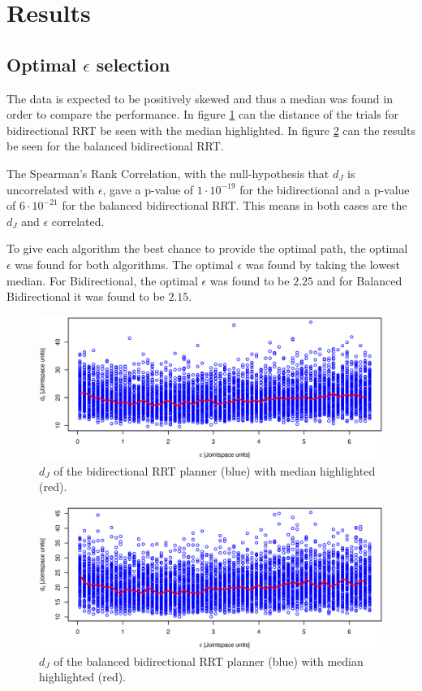 \section{Results} 
\subsection{Optimal \(\epsilon\) selection}
The data is expected to be positively skewed and thus a median was found in order to compare the performance.
In figure \ref{fig:bidir_correlated} can the distance of the trials for bidirectional RRT be seen with the median highlighted.
In figure \ref{fig:balanced_correlated} can the results be seen for the balanced bidirectional RRT.

The Spearman's Rank Correlation, with the null-hypothesis that \(d_J\) is uncorrelated with \(\epsilon\),
gave a p-value of \(1\cdot 10^{-19}\) for the bidirectional and a p-value of \(6\cdot 10^{-21}\) for the balanced bidirectional RRT.
This means in both cases are the \(d_J\) and \(\epsilon\) correlated.

To give each algorithm the best chance to provide the optimal path, the optimal \(\epsilon\) was found for both algorithms.
The optimal \(\epsilon\) was found by taking the lowest median.
For Bidirectional, the optimal \(\epsilon\) was found to be \(2.25\) and for Balanced Bidirectional it was found to be \(2.15\).

\begin{figure}[H]
 \centering
 \includegraphics[width=\figsize]{graphics/bidirectional_correlation}
 \caption{\(d_J\) of the bidirectional RRT planner (blue) with median highlighted (red).}
 \label{fig:bidir_correlated}
\end{figure}

\begin{figure}[H]
 \centering
 \includegraphics[width=\figsize]{graphics/balanced_correlation}
 \caption{\(d_J\) of the balanced bidirectional RRT planner (blue) with median highlighted (red).}
 \label{fig:balanced_correlated}
\end{figure}

